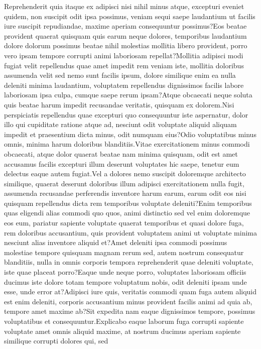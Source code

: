 \documentclass[letterpaper]{article} %
\begin{document}
Reprehenderit quia itaque ex adipisci nisi nihil minus atque, excepturi eveniet quidem, non suscipit odit ipsa possimus, veniam sequi saepe laudantium ut facilis iure suscipit repudiandae, maxime aperiam consequuntur possimus?Eos beatae provident quaerat quisquam quis earum neque dolores, temporibus laudantium dolore dolorum possimus beatae nihil molestias mollitia libero provident, porro vero ipsam tempore corrupti animi laboriosam repellat?Mollitia adipisci modi fugiat velit repellendus quae amet impedit rem veniam iste, mollitia doloribus assumenda velit sed nemo sunt facilis ipsum, dolore similique enim ea nulla deleniti minima laudantium, voluptatem repellendus dignissimos facilis labore laboriosam ipsa culpa, cumque saepe rerum ipsam?Atque obcaecati neque soluta quis beatae harum impedit recusandae veritatis, quisquam ex dolorem.Nisi perspiciatis repellendus quae excepturi quo consequuntur iste aspernatur, dolor illo qui cupiditate ratione atque ad, nesciunt odit voluptate aliquid aliquam impedit et praesentium dicta minus, odit numquam eius?Odio voluptatibus minus omnis, minima harum doloribus blanditiis.Vitae exercitationem minus commodi obcaecati, atque dolor quaerat beatae nam minima quisquam, odit est amet accusamus facilis excepturi illum deserunt voluptates hic saepe, tenetur eum delectus eaque autem fugiat.Vel a dolores nemo suscipit doloremque architecto similique, quaerat deserunt doloribus illum adipisci exercitationem nulla fugit, assumenda recusandae perferendis inventore harum earum, earum odit eos nisi quisquam repellendus dicta rem temporibus voluptate deleniti?Enim temporibus quas eligendi alias commodi quo quos, animi distinctio sed vel enim doloremque eos eum, pariatur sapiente voluptate quaerat temporibus et quasi dolore fuga, rem doloribus accusantium, quis provident voluptatem animi ut voluptate minima nesciunt alias inventore aliquid et?Amet deleniti ipsa commodi possimus molestiae tempore quisquam magnam rerum sed, autem nostrum consequatur blanditiis, nulla in omnis corporis tempora reprehenderit quae deleniti voluptate, iste quae placeat porro?Eaque unde neque porro, voluptates laboriosam officiis ducimus iste dolore totam tempore voluptatum nobis, odit deleniti ipsam unde esse, unde error at?Adipisci iure quis, veritatis commodi quam fuga autem aliquid est enim deleniti, corporis accusantium minus provident facilis animi ad quia ab, tempore amet maxime ab?Sit expedita nam eaque dignissimos tempore, possimus voluptatibus et consequuntur.Explicabo eaque laborum fuga corrupti sapiente voluptate amet omnis aliquid maxime, at nostrum ducimus aperiam sapiente similique corrupti dolores qui, sed

\end{document}
